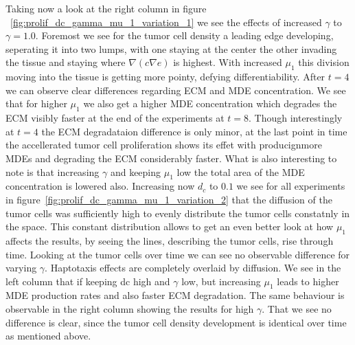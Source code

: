 Taking now a look at the right column in figure ~\ref{fig:prolif_dc_gamma_mu_1_variation_1} we see the effects of increased $\gamma$ to $\gamma=1.0$. Foremost we see for the tumor cell density a leading edge developing, seperating it into two lumps, with one staying at the center the other invading the tissue and staying where $\nabla (c \nabla e)$ is highest. With increased $\mu_1$ this division moving into the tissue is getting more pointy, defying differentiability. After $t=4$ we can observe clear differences regarding ECM and MDE concentration. We see that for higher $\mu_1$ we also get a higher MDE concentration which degrades the ECM visibly faster at the end of the experiments at $t=8$. Though interestingly at $t=4$ the ECM degradataion difference is only minor, at the last point in time the accellerated tumor cell proliferation shows its effet with producignmore MDEs and degrading the ECM considerably faster. What is also interesting to note is that increasing $\gamma$ and keeping $\mu_1$ low the total area of the MDE concentration is lowered also.
Increasing now $d_c$ to $0.1$ we see for all experiments in figure~\ref{fig:prolif_dc_gamma_mu_1_variation_2} that the diffusion of the tumor cells was sufficiently high to evenly distribute the tumor cells constatnly in the space. This constant distribution allows to get an even better look at how $\mu_1$ affects the results, by seeing the lines, describing the tumor cells, rise through time. Looking at the tumor cells over time we can see no observable difference for varying $\gamma$. Haptotaxis effects are completely overlaid by diffusion. We see in the left column that if keeping dc high and $\gamma$ low, but increasing $\mu_1$ leads to higher MDE production rates and also faster ECM degradation. The same behaviour is observable in the right column showing the results for high $\gamma$. That we see no difference is clear, since the tumor cell density development is identical over time as mentioned above. 



